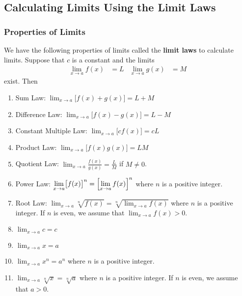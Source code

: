 \subsection{Calculating Limits Using the Limit Laws}

\subsubsection*{Properties of Limits}
We have the following properties of limits called the \textbf{limit laws} to
calculate limits.
Suppose that \(c\) is a constant and the limits
\begin{align*}
    \lim_{x\to a}f(x) &= L & \lim_{x\to a}g(x) &= M
\end{align*}
exist.
Then
\begin{enumerate}
    \item Sum Law: \(\displaystyle{\lim_{x\to a}\bigl[f(x)+g(x)\bigr]=L+M}\)
    \item Difference Law: \(\displaystyle{\lim_{x\to a}\bigl[f(x)-g(x)\bigr]=L-M}\)
    \item Constant Multiple Law: \(\displaystyle{\lim_{x\to a}\bigl[cf(x)\bigr]=cL}\)
    \item Product Law: \(\displaystyle{\lim_{x\to a}\bigl[f(x)g(x)\bigr]=LM}\)
    \item Quotient Law: \(\displaystyle{\lim_{x\to a}\frac{f(x)}{g(x)}=\frac{L}{M}}\) if
    \(M\neq 0\).
    \item Power Law: \(\displaystyle{\lim_{x\to a}\bigl[f(x)\bigr]^n
    =\Bigl[\lim_{x\to a}f(x)\Bigr]^n}\) where \(n\) is a positive integer.
    \item Root Law: \(\displaystyle{\lim_{x\to a}\sqrt[n]{f(x)}
    =\sqrt[n]{\lim_{x\to a}f(x)}}\) where \(n\) is a positive integer.
    If \(n\) is even, we assume that \(\displaystyle{\lim_{x\to a}f(x)>0}\).
    \item \(\displaystyle{\lim_{x\to a}c=c}\)
    \item \(\displaystyle{\lim_{x\to a}x=a}\)
    \item \(\displaystyle{\lim_{x\to a}x^n=a^n}\) where \(n\) is a positive
    integer.
    \item \(\displaystyle{\lim_{x\to a}\sqrt[n]{x}=\sqrt[n]{a}}\) where \(n\)
    is a positive integer.
    If \(n\) is even, we assume that \(a>0\).
\end{enumerate}
